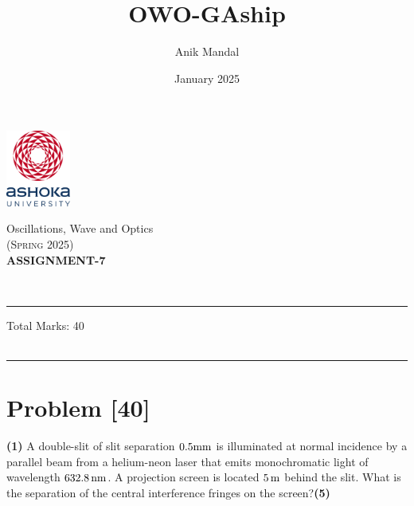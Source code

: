 \documentclass[12pt, a4paper]{article}
\title{OWO-GAship}
\author{Anik Mandal}
\date{January 2025}
\begin{document}
\begin{minipage}[t][][c]{0.1\textwidth}
    \begin{flushleft}
        \includegraphics[height=2.5cm]{tex-resources/Ashoka Logo.png}
    \end{flushleft}
\end{minipage}
\begin{minipage}[t][][c]{0.85\textwidth}
    \begin{center}
        {\LARGE Oscillations, Wave and Optics}\\ \vspace{0.5em}
        \textsc{(Spring 2025)}\\
        \vspace{1em}
        \textbf{\Large ASSIGNMENT-7} \\
    \end{center}
\end{minipage}
\vspace{10pt}\\
\rule[0em]{\textwidth}{0.75pt}

\hfill 
Total Marks: 40   \\
\hfill
{}\\
\vspace{.2cm}
\rule[0em]{\textwidth}{1.75pt}
\vspace{-1cm}
\justifying

\section*{Problem \hfill \textbf{[40]}}
\textbf{(1)} A double-slit of slit separation $0.5{\rm mm}$ is illuminated at normal incidence by a 
parallel beam from a helium-neon laser that emits monochromatic light of wavelength $632.8\,{\rm nm}$.
A projection screen is located $5\,{\rm m}$ behind the slit. What is the separation of the central 
interference fringes on the screen?\hfill\textbf{(5)}\\
\end{document}
